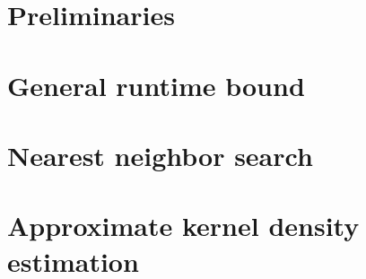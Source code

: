\documentclass{article} %
\begin{document}



\vspace*{-1em}
\section{Preliminaries}
\vspace*{-0.6em}



\vspace*{-0.6em}
\section{General runtime bound}
\vspace*{-0.4em}



\vspace*{-0.8em}
\section{Nearest neighbor search}
\vspace*{-0.4em}



\vspace*{-0.6em}
\section{Approximate kernel density estimation}
\vspace*{-0.6em}
\end{document}
